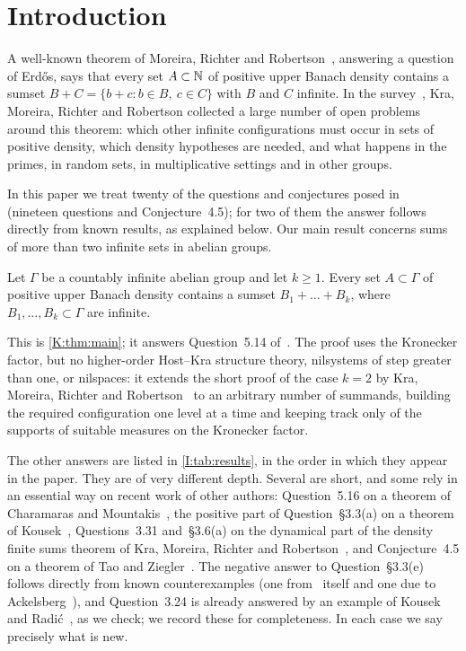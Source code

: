 \section{Introduction}\label{I:sec:intro}

A well-known theorem of Moreira, Richter and Robertson~\cite{moreira2019proof}, answering a question of
Erd\H{o}s, says that every set $A\subset\mathbb{N}$ of positive upper Banach density contains a sumset
$B+C=\{b+c:b\in B,\ c\in C\}$ with $B$ and $C$ infinite. In the survey~\cite{kra2023problems},
Kra, Moreira, Richter and Robertson collected a large number of open problems around this theorem:
which other infinite configurations must occur in sets of positive density, which density
hypotheses are needed, and what happens in the primes, in random sets, in multiplicative settings and
in other groups.

In this paper we treat twenty of the questions and conjectures posed in~\cite{kra2023problems}
(nineteen questions and Conjecture~4.5); for two of them the answer follows directly from known
results, as explained below. Our main result
concerns sums of more than two infinite sets in abelian groups.

\begin{mainthm}
Let $\Gamma$ be a countably infinite abelian group and let $k\ge1$. Every set $A\subset\Gamma$ of
positive upper Banach density contains a sumset $B_1+\dots+B_k$, where $B_1,\dots,B_k\subset\Gamma$
are infinite.
\end{mainthm}

This is \cref{K:thm:main}; it answers Question~5.14 of~\cite{kra2023problems}. The proof uses the
Kronecker factor, but no higher-order Host--Kra structure theory, nilsystems of step greater than
one, or nilspaces: it extends the short proof of the case $k=2$
by Kra, Moreira, Richter and Robertson~\cite{kra2026short} to an arbitrary number of summands,
building the required configuration one level at a time and keeping track only of the supports of
suitable measures on the Kronecker factor.

The other answers are listed in \cref{I:tab:results}, in the order in which they appear in the
paper. They are of very different depth. Several are short, and some rely in an essential way on
recent work of other authors: Question~5.16 on a theorem of Charamaras and
Mountakis~\cite{charamaras2024finding}, the positive part of Question~\S3.3(a) on a theorem of
Kousek~\cite{kousek2025asymmetric}, Questions~3.31 and~\S3.6(a) on the dynamical part of the density
finite sums theorem of Kra, Moreira, Richter and Robertson~\cite{kra2025density}, and Conjecture~4.5
on a theorem of Tao and Ziegler~\cite{tao2023infinite}. The negative answer to Question~\S3.3(e)
follows directly from known counterexamples (one from~\cite{kra2023problems} itself and one due to
Ackelsberg~\cite{ackelsberg2024counterexamples}), and Question~3.24 is already answered by an example
of Kousek and Radi\'c~\cite{kousek2024infinite}, as we check; we record these for completeness. In
each case we say precisely what is new.

